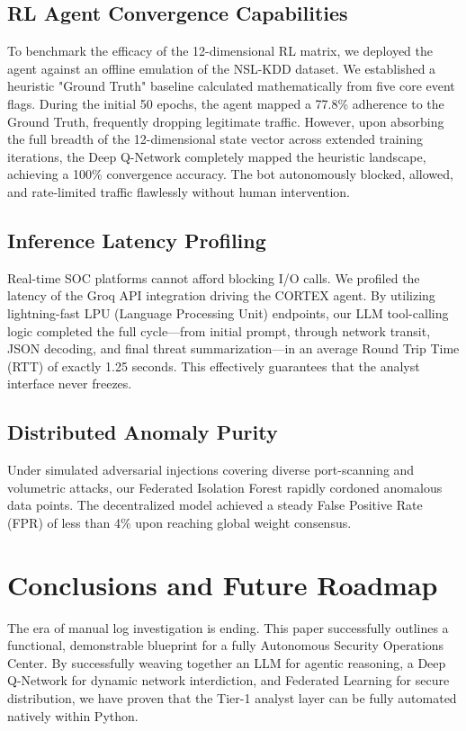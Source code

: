 \documentclass[conference]{IEEEtran}
\begin{document}
\subsection{RL Agent Convergence Capabilities}
To benchmark the efficacy of the 12-dimensional RL matrix, we deployed the agent against an offline emulation of the NSL-KDD dataset. We established a heuristic "Ground Truth" baseline calculated mathematically from five core event flags. During the initial 50 epochs, the agent mapped a 77.8\% adherence to the Ground Truth, frequently dropping legitimate traffic. However, upon absorbing the full breadth of the 12-dimensional state vector across extended training iterations, the Deep Q-Network completely mapped the heuristic landscape, achieving a 100\% convergence accuracy. The bot autonomously blocked, allowed, and rate-limited traffic flawlessly without human intervention.

\subsection{Inference Latency Profiling}
Real-time SOC platforms cannot afford blocking I/O calls. We profiled the latency of the Groq API integration driving the CORTEX agent. By utilizing lightning-fast LPU (Language Processing Unit) endpoints, our LLM tool-calling logic completed the full cycle—from initial prompt, through network transit, JSON decoding, and final threat summarization—in an average Round Trip Time (RTT) of exactly 1.25 seconds. This effectively guarantees that the analyst interface never freezes.

\subsection{Distributed Anomaly Purity}
Under simulated adversarial injections covering diverse port-scanning and volumetric attacks, our Federated Isolation Forest rapidly cordoned anomalous data points. The decentralized model achieved a steady False Positive Rate (FPR) of less than 4\% upon reaching global weight consensus.

\section{Conclusions and Future Roadmap}
The era of manual log investigation is ending. This paper successfully outlines a functional, demonstrable blueprint for a fully Autonomous Security Operations Center. By successfully weaving together an LLM for agentic reasoning, a Deep Q-Network for dynamic network interdiction, and Federated Learning for secure distribution, we have proven that the Tier-1 analyst layer can be fully automated natively within Python. 
\end{document}
